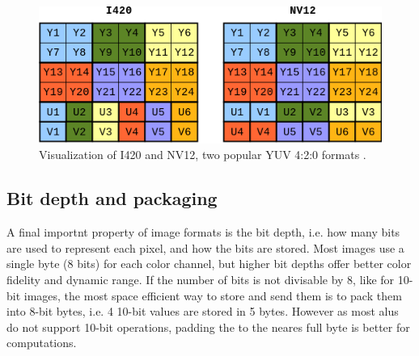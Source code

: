 \begin{figure}[H]
    \centering
    \includegraphics[width=.8\textwidth]{figures/debayer/YUV_packaging.png}
    \caption{Visualization of I420 and NV12, two popular YUV 4:2:0 formats \cite{baranYUVFormats2018}.}
    \label{fig:image_packaging}
\end{figure}

\subsection{Bit depth and packaging}
A final importnt property of image formats is the bit depth, i.e.
how many bits are used to represent each pixel, and how the bits are stored.
Most images use a single byte (8 bits) for each color channel, but higher bit depths offer better color fidelity and dynamic range.
If the number of bits is not divisable by 8, like for 10-bit images, the most space efficient way to store and send them is to pack them into 8-bit bytes, i.e.
4 10-bit values are stored in 5 bytes.
However as most \glspl{alu} do not support 10-bit operations, padding the to the neares full byte is better for computations.